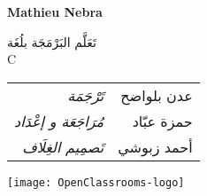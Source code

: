 \thispagestyle{empty}
\cleardoublepage
\thispagestyle{empty}
\begin{center}
{\fontsize{0.7cm}{1.4cm}\selectfont\bfseries
\textcolor{section}{\textenglish{Mathieu Nebra}}
}

\vspace{1cm}
\textcolor{chapter}{\mdseries
{\fontsize{2cm}{4cm}\selectfont
تَعَلَّم البَرْمَجَة بلُغَة}\\
{\fontsize{3cm}{6cm}\selectfont
\textenglish{C}
}
}

\vfill

{
\fontsize{0.5cm}{1.5cm}\selectfont

\begin{tabu} to 0.5
تَرْجَمَة & عدن بلواضح\\
مُرَاجَعَة و إعْدَاد & حمزة عبّاد\\
تَصمِيم الغِلَاف & أحمد زبوشي\\
\end{tabu}
}

\vfill
\texttt{[image: OpenClassrooms-logo]}
\end{center}
